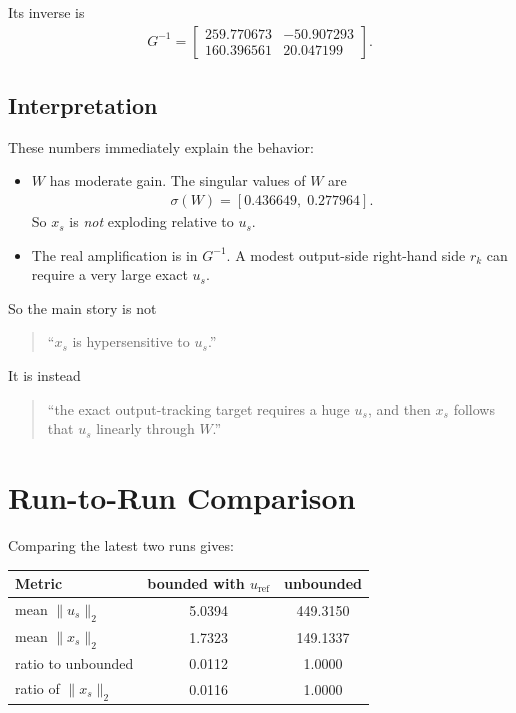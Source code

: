 \documentclass[11pt]{article}
\begin{document}
Its inverse is
\begin{align}
G^{-1} =
\begin{bmatrix}
259.770673 & -50.907293 \\
160.396561 & 20.047199
\end{bmatrix}.
\end{align}

\subsection{Interpretation}

These numbers immediately explain the behavior:
\begin{itemize}
\item $W$ has moderate gain. The singular values of $W$ are
\begin{align}
\sigma(W) = [0.436649,\; 0.277964].
\end{align}
So $x_s$ is \emph{not} exploding relative to $u_s$.
\item The real amplification is in $G^{-1}$. A modest output-side right-hand side $r_k$ can require a very large exact $u_s$.
\end{itemize}

So the main story is not
\begin{quote}
``$x_s$ is hypersensitive to $u_s$.''
\end{quote}
It is instead
\begin{quote}
``the exact output-tracking target requires a huge $u_s$, and then $x_s$ follows that $u_s$ linearly through $W$.'' 
\end{quote}

\section{Run-to-Run Comparison}

Comparing the latest two runs gives:
\begin{center}
\begin{tabular}{lcc}
\toprule
Metric & bounded with $u_{\mathrm{ref}}$ & unbounded \\
\midrule
mean $\|u_s\|_2$ & 5.0394 & 449.3150 \\
mean $\|x_s\|_2$ & 1.7323 & 149.1337 \\
ratio to unbounded & 0.0112 & 1.0000 \\
ratio of $\|x_s\|_2$ & 0.0116 & 1.0000 \\
\bottomrule
\end{tabular}
\end{center}
\end{document}
